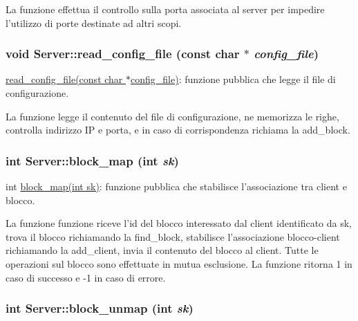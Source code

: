 La funzione effettua il controllo sulla porta associata al server per impedire l'utilizzo di porte destinate ad altri scopi. \hypertarget{classServer_9e4fb38f735a2cbc9dcef29fbe8b18a6_9e4fb38f735a2cbc9dcef29fbe8b18a6}{
\subsubsection[{read\_\-config\_\-file}]{\setlength{\rightskip}{0pt plus 5cm}void Server::read\_\-config\_\-file (const char $\ast$ {\em config\_\-file})}}
\label{classServer_9e4fb38f735a2cbc9dcef29fbe8b18a6_9e4fb38f735a2cbc9dcef29fbe8b18a6}


\hyperlink{classServer_9e4fb38f735a2cbc9dcef29fbe8b18a6_9e4fb38f735a2cbc9dcef29fbe8b18a6}{read\_\-config\_\-file(const char $\ast$config\_\-file)}: funzione pubblica che legge il file di configurazione. 

La funzione legge il contenuto del file di configurazione, ne memorizza le righe, controlla indirizzo IP e porta, e in caso di corrispondenza richiama la add\_\-block. \hypertarget{classServer_0ecc5509a88df842b30d31097a20d000_0ecc5509a88df842b30d31097a20d000}{
\subsubsection[{block\_\-map}]{\setlength{\rightskip}{0pt plus 5cm}int Server::block\_\-map (int {\em sk})}}
\label{classServer_0ecc5509a88df842b30d31097a20d000_0ecc5509a88df842b30d31097a20d000}


int \hyperlink{classServer_0ecc5509a88df842b30d31097a20d000_0ecc5509a88df842b30d31097a20d000}{block\_\-map(int sk)}: funzione pubblica che stabilisce l'associazione tra client e blocco. 

La funzione funzione riceve l'id del blocco interessato dal client identificato da sk, trova il blocco richiamando la find\_\-block, stabilisce l'associazione blocco-client richiamando la add\_\-client, invia il contenuto del blocco al client. Tutte le operazioni sul blocco sono effettuate in mutua esclusione. La funzione ritorna 1 in caso di successo e -1 in caso di errore. \hypertarget{classServer_da69667b5b906019f56db4d403412f89_da69667b5b906019f56db4d403412f89}{
\subsubsection[{block\_\-unmap}]{\setlength{\rightskip}{0pt plus 5cm}int Server::block\_\-unmap (int {\em sk})}}
\label{classServer_da69667b5b906019f56db4d403412f89_da69667b5b906019f56db4d403412f89}


